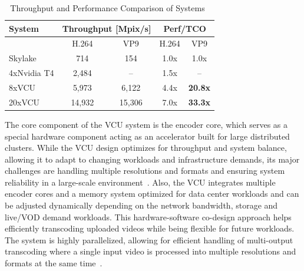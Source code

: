 \begin{table}[h!]
\centering
\caption{Throughput and Performance Comparison of Systems~\parencite{youtube_vpu}}\label{tab:youtube-vcu}
\begin{tabular}{|l|cc|cc|}
\hline
\textbf{System}      & \multicolumn{2}{c|}{\textbf{Throughput [Mpix/s]}} & \multicolumn{2}{c|}{\textbf{Perf/TCO}}    \\ \hline
            & \multicolumn{1}{c|}{H.264}       & VP9       & \multicolumn{1}{c|}{H.264} & VP9 \\ \hline
Skylake     & \multicolumn{1}{c|}{714}            & 154           & \multicolumn{1}{c|}{1.0x}      & 1.0x     \\ \hline
4xNvidia T4 & \multicolumn{1}{c|}{2,484}          & --            & \multicolumn{1}{c|}{1.5x}      & --       \\ \hline
8xVCU       & \multicolumn{1}{c|}{5,973}          & 6,122         & \multicolumn{1}{c|}{4.4x}      & \textbf{20.8x}    \\ \hline
20xVCU      & \multicolumn{1}{c|}{14,932}         & 15,306        & \multicolumn{1}{c|}{7.0x}      & \textbf{33.3x}    \\ \hline
\end{tabular}
\end{table}

The core component of the \ac{VCU} system is the encoder core, which serves as a special hardware component acting as an accelerator built for large distributed clusters. 
While the \ac{VCU} design optimizes for throughput and system balance, allowing it to adapt to changing workloads and infrastructure demands, its major challenges are handling multiple resolutions and formats and ensuring system reliability in a large-scale environment~\parencite{youtube_vpu}.
Also, the \ac{VCU} integrates multiple encoder cores and a memory system optimized for data center workloads and can be adjusted dynamically depending on the network bandwidth, storage and live/\ac{VOD} demand workloads. This hardware-software co-design approach helps efficiently transcoding uploaded videos while being flexible for future workloads. The system is highly parallelized, allowing for efficient handling of multi-output transcoding where a single input video is processed into multiple resolutions and formats at the same time~\parencite{youtube_vpu}.

